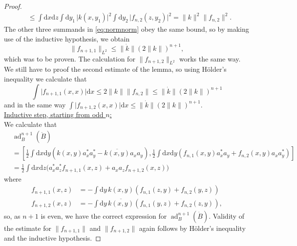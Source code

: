 \documentclass[11pt,a4paper,draft,DIV11]{scrartcl}	%
\newcommand{\ad}{\operatorname{ad}}	%
\newcommand{\di}{\textrm{d}}		%
\newcommand{\cc}[1]{\overline{#1}}	%
\newcommand{\norm}[1]{\lVert#1\rVert}	%
\newcommand{\bd}{\begin{displaymath}}			%
\newcommand{\ed}{\end{displaymath}}
\newcommand{\eqr}[1]{\eqref{eq:#1}}			%
\begin{document}
\begin{proof}
\begin{align*}
& \leq \int \di x \di z \int \di y_1\,\lvert k(x,y_1) \rvert^2 \int \di y_2\,\lvert f_{n,2}(z,y_2) \rvert^2 = \norm{k}^2 \norm{f_{n,2}}^2. 
\end{align*}
The other three summands in \eqr{normnorm} obey the same bound, so by making use of the inductive hypothesis, we obtain
\bd
\norm{f_{n+1,1}}_{L^2} \leq \norm{\dot k} (2\norm{k})^{n+1},
\ed
which was to be proven. The calculation for $\norm{f_{n+1,2}}_{L^2}$ works the same way. We still have to proof the second estimate of the lemma, so using H\"older's inequality we calculate that
\[
\int \lvert f_{n+1,1}(x,x) \rvert \di x \leq 2\norm{k} \norm{f_{n,2}} \leq \norm{\dot k} (2\norm{k})^{n+1}
\]
and in the same way $\int \lvert f_{n+1,2}(x,x) \rvert \di x \leq \norm{\dot k}(2\norm{k})^{n+1}$.\vspace{1em}\\
\underline{Inductive step, starting from odd $n$:}\\
We calculate that%
\begin{align*}
& \ad^{n+1}_B(\dot B)\\
& = \left[ \frac{1}{2}\int \di x \di y \left( k(x,y)a^\ast_x a^\ast_y - \cc{k(x,y)} a_x a_y \right) , \frac{1}{2}\int \di x\di y \left( f_{n,1}(x,y) a^\ast_x a_y + f_{n,2}(x,y) a_x a^\ast_y \right) \right] \\
& = \frac{1}{2} \int \di x\di z \big( a^\ast_x a^\ast_z f_{n+1,1}(x,z) + a_x a_z f_{n+1,2}(x,z) \big)
\end{align*}
where
\begin{equation}
\label{eq:odd}
\begin{split}
f_{n+1,1}(x,z) & = - \int \di y\, k(x,y)\left( f_{n,1}(z,y) + f_{n,2}(y,z) \right) \\
f_{n+1,2}(x,z) & = - \int \di y\, \cc{k(x,y)}\left( f_{n,1}(y,z) + f_{n,2}(z,y) \right),
\end{split}
\end{equation}
so, as $n+1$ is even, we have the correct expression for $\ad^{n+1}_B(\dot B)$. Validity of the estimate for $\norm{f_{n+1,1}}$ and $\norm{f_{n+1,2}}$ again follows by H\"older's inequality and the inductive hypothesis.
\end{proof}
\end{document}
